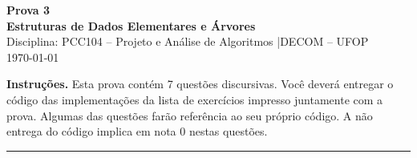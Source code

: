 \documentclass[9pt,a4paper]{extarticle}
\begin{document}
\begin{center}
  \Large \textbf{Prova 3 \\ Estruturas de Dados Elementares e Árvores} \\[4pt]
  \normalsize Disciplina: PCC104 -- Projeto e Análise de Algoritmos \quad|\quad DECOM -- UFOP \\[2pt]
  \normalsize \today
\end{center}

\medskip
\noindent\textbf{Instruções.} Esta prova contém 7 questões discursivas. Você deverá entregar o código das implementações da lista de exercícios impresso juntamente com a prova. Algumas das questões farão referência ao seu próprio código. A não entrega do código implica em nota 0 nestas questões.

\bigskip\hrule\bigskip
\end{document}
